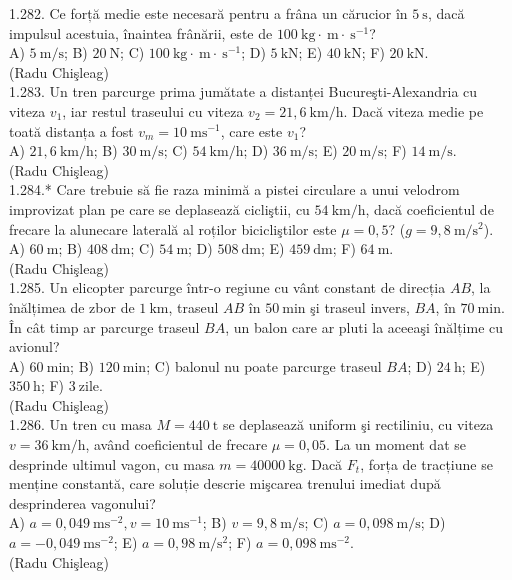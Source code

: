 {1.282. Ce forță medie este necesară pentru a frâna un cărucior în $5 \mathrm{~s}$, dacă impulsul acestuia, înaintea frânării, este de $100 \mathrm{~kg} \cdot \mathrm{~m} \cdot \mathrm{~s}^{-1}$?\\ A) $5 \mathrm{~m} / \mathrm{s}$; B) $20 \mathrm{~N}$; C) $100 \mathrm{~kg} \cdot \mathrm{~m} \cdot \mathrm{~s}^{-1}$; D) $5 \mathrm{~kN}$; E) $40 \mathrm{~kN}$; F) $20 \mathrm{~kN}$.\\ (Radu Chişleag)\\

1.283. Un tren parcurge prima jumătate a distanței Bucureşti-Alexandria cu viteza $v_{1}$, iar restul traseului cu viteza $v_{2}=21,6 \mathrm{~km} / \mathrm{h}$. Dacă viteza medie pe toată distanța a fost $v_{m}=10 \mathrm{~ms}^{-1}$, care este $v_{1}$?\\ A) $21,6 \mathrm{~km} / \mathrm{h}$; B) $30 \mathrm{~m} / \mathrm{s}$; C) $54 \mathrm{~km} / \mathrm{h}$; D) $36 \mathrm{~m} / \mathrm{s}$; E) $20 \mathrm{~m} / \mathrm{s}$; F) $14 \mathrm{~m} / \mathrm{s}$.\\ (Radu Chişleag)\\

1.284.* Care trebuie să fie raza minimă a pistei circulare a unui velodrom improvizat plan pe care se deplasează cicliştii, cu $54 \mathrm{~km} / \mathrm{h}$, dacă coeficientul de frecare la alunecare laterală al roților bicicliştilor este $\mu=0,5$? ($g=9,8 \mathrm{~m} / \mathrm{s}^{2}$).\\ A) $60 \mathrm{~m}$; B) $408 \mathrm{~dm}$; C) $54 \mathrm{~m}$; D) $508 \mathrm{~dm}$; E) $459 \mathrm{~dm}$; F) $64 \mathrm{~m}$.\\ (Radu Chişleag)\\

1.285. Un elicopter parcurge într-o regiune cu vânt constant de direcția $AB$, la înălțimea de zbor de $1 \mathrm{~km}$, traseul $AB$ în $50 \mathrm{~min}$ şi traseul invers, $BA$, în $70 \mathrm{~min}$. În cât timp ar parcurge traseul $BA$, un balon care ar pluti la aceeaşi înălțime cu avionul?\\ A) $60 \mathrm{~min}$; B) $120 \mathrm{~min}$; C) balonul nu poate parcurge traseul $BA$; D) $24 \mathrm{~h}$; E) $350 \mathrm{~h}$; F) $3 \mathrm{~zile}$.\\ (Radu Chişleag)\\

1.286. Un tren cu masa $M=440 \mathrm{~t}$ se deplasează uniform şi rectiliniu, cu viteza $v=36 \mathrm{~km} / \mathrm{h}$, având coeficientul de frecare $\mu=0,05$. La un moment dat se desprinde ultimul vagon, cu masa $m=40000 \mathrm{~kg}$. Dacă $F_{t}$, forța de tracțiune se menține constantă, care soluție descrie mişcarea trenului imediat după desprinderea vagonului?\\ A) $a=0,049 \mathrm{~ms}^{-2}, v=10 \mathrm{~ms}^{-1}$; B) $v=9,8 \mathrm{~m} / \mathrm{s}$; C) $a=0,098 \mathrm{~m} / \mathrm{s}$; D) $a=-0,049 \mathrm{~ms}^{-2}$; E) $a=0,98 \mathrm{~m} / \mathrm{s}^{2}$; F) $a=0,098 \mathrm{~ms}^{-2}$.\\ (Radu Chişleag)\\

}
